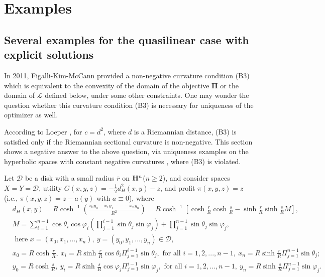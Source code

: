\chapter{Examples}\label{chapter:examples}




\section{Several examples for the quasilinear case with explicit solutions}

In 2011, Figalli-Kim-McCann \cite{FigalliKimMcCann11} provided a non-negative curvature condition (B3) which is equivalent to the convexity of the 
domain of the objective
 $\pmb \Pi$ or the domain of 
 $\mathcal{L}$ defined below, under some other constraints. One may wonder the question whether this curvature condition (B3) is 
necessary for 
uniqueness of the 
optimizer 
as well. \medskip

According to Loeper \cite{Loeper09}, 
for $c=d^2$, where $d$ is a Riemannian distance, (B3) is satisfied only if the Riemannian sectional curvature is non-negative.
This section shows a negative answer to the above question, via uniqueness examples on the hyperbolic spaces with constant negative curvatures%
, where (B3) is violated. \medskip

Let $\mathcal{D}$ be a disk with a small radius $\bar{r}$ on ${\mathbf H}^n$($n\ge 2$), and consider spaces $X= Y = \mathcal{D}$, utility $G(x,y,z)=-\frac{1}{2}d_H^2(x,y) -z$, and profit $\pi(x,y,z) = z$ (i.e., $\pi(x,y,z) = z -a(y)$ with $a \equiv 0$), where
\begin{equation}\label{distanceh}
\begin{split}
&d_H(x,y)= R\cosh^{-1}\left(\frac{x_0y_0-x_1y_1-\cdots -x_ny_n}{R^2}\right)= R\cosh^{-1}\left[\cosh \frac{r}{R}\cosh \frac{s}{R}-\sinh \frac{r}{R}\sinh\frac{s}{R} M\right],\\
&M=\sum_{i=1}^{n-1}\cos\theta_i \cos\varphi_i\left(\prod_{j=1}^{i-1} \sin\theta_j\sin\varphi_j\right)+ \prod_{j=1}^{n-1} \sin\theta_j\sin\varphi_j,\\
&\text{ here } x=(x_0,x_1,\dots, x_n),~y=(y_0,y_1,\dots, y_n) \in \mathcal{D},\\& x_0 = R\cosh \frac{r}{R},~ x_i = R\sinh \frac{r}{R}\cos\theta_i \Pi_{j=1}^{i-1}\sin \theta_j, \text{ for all } i=1,2,...,n-1, ~x_n = R\sinh \frac{r}{R} \Pi_{j=1}^{n-1}\sin \theta_j;\\
&y_0 = R\cosh \frac{s}{R},~ y_i = R\sinh \frac{s}{R}\cos\varphi_i \Pi_{j=1}^{i-1}\sin \varphi_j, \text{ for all } i=1,2,...,n-1,~ y_n = R\sinh \frac{s}{R} \Pi_{j=1}^{n-1}\sin \varphi_j.
\end{split}
\end{equation} \medskip

